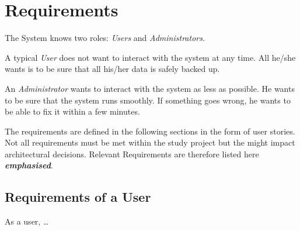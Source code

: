 \newcommand{\relevantreq}[1]{\textit{\textbf{#1}}}

\section{Requirements}

The System knows two roles: \emph{Users} and \emph{Administrators}.

A typical \emph{User} does not want to interact with the system at any time.
All he/she wants is to be sure that all his/her data is safely backed
up.

An \emph{Administrator} wants to interact with the system as less as possible.
He wants to be sure that the system runs smoothly. If something goes
wrong, he wants to be able to fix it within a few minutes.


The requirements are defined in the following sections in the form of user stories.
Not all requirements must be met within the study project but the might %
impact architectural decisions. Relevant Requirements are therefore listed here \relevantreq{emphasised}.

\subsection{Requirements of a User}
As a user, \ldots{}

